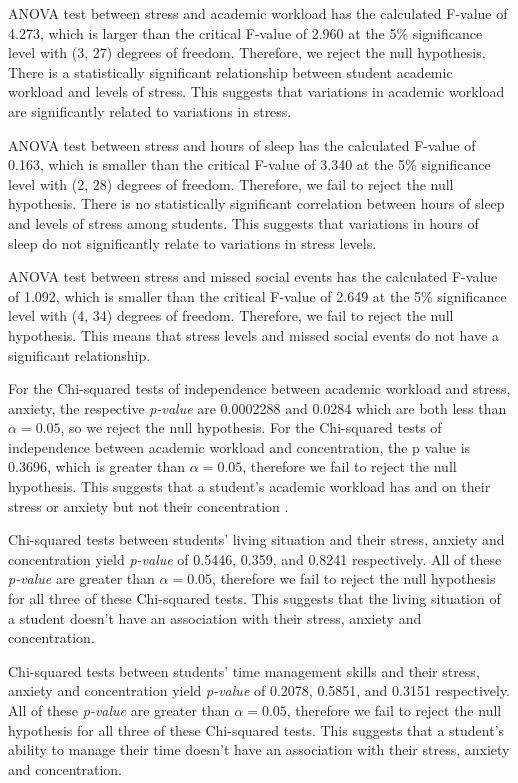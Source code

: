 \documentclass[
  letterpaper,
  DIV=11,
  numbers=noendperiod]{scrartcl}
\begin{document}
ANOVA test between stress and academic workload has the calculated
F-value of 4.273, which is larger than the critical F-value of 2.960 at
the 5\% significance level with (3, 27) degrees of freedom. Therefore,
we reject the null hypothesis. There is a statistically significant
relationship between student academic workload and levels of stress.
This suggests that variations in academic workload are significantly
related to variations in stress.

ANOVA test between stress and hours of sleep has the calculated F-value
of 0.163, which is smaller than the critical F-value of 3.340 at the 5\%
significance level with (2, 28) degrees of freedom. Therefore, we fail
to reject the null hypothesis. There is no statistically significant
correlation between hours of sleep and levels of stress among students.
This suggests that variations in hours of sleep do not significantly
relate to variations in stress levels.

ANOVA test between stress and missed social events has the calculated
F-value of 1.092, which is smaller than the critical F-value of 2.649 at
the 5\% significance level with (4, 34) degrees of freedom. Therefore,
we fail to reject the null hypothesis. This means that stress levels and
missed social events do not have a significant relationship.

For the Chi-squared tests of independence between academic workload and
stress, anxiety, the respective \emph{p-value} are 0.0002288 and 0.0284
which are both less than \(\alpha=0.05\), so we reject the null
hypothesis. For the Chi-squared tests of independence between academic
workload and concentration, the p value is 0.3696, which is greater than
\(\alpha=0.05\), therefore we fail to reject the null hypothesis. This
suggests that a student's academic workload has and on their stress or
anxiety but not their concentration .

Chi-squared tests between students' living situation and their stress,
anxiety and concentration yield \emph{p-value} of 0.5446, 0.359, and
0.8241 respectively. All of these \emph{p-value} are greater than
\(\alpha=0.05\), therefore we fail to reject the null hypothesis for all
three of these Chi-squared tests. This suggests that the living
situation of a student doesn't have an association with their stress,
anxiety and concentration.

Chi-squared tests between students' time management skills and their
stress, anxiety and concentration yield \emph{p-value} of 0.2078,
0.5851, and 0.3151 respectively. All of these \emph{p-value} are greater
than \(\alpha=0.05\), therefore we fail to reject the null hypothesis
for all three of these Chi-squared tests. This suggests that a student's
ability to manage their time doesn't have an association with their
stress, anxiety and concentration.
\end{document}
